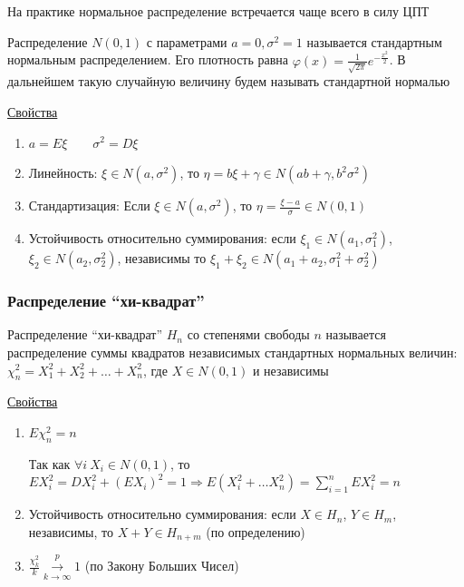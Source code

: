 \documentclass[12pt]{article}
\begin{document}
На практике нормальное распределение встречается чаще всего в силу ЦПТ

\Def Распределение $N(0, 1)$ с параметрами $a = 0, \sigma^2 = 1$ называется стандартным нормальным распределением. 
Его плотность равна $\varphi(x) = \frac{1}{\sqrt{2\pi}} e^{-\frac{x^2}{2}}$. 
В дальнейшем такую случайную величину будем называть стандартной нормалью

\underline{Свойства}

\begin{enumerate}
    \item $a = E\xi \qquad \sigma^2 = D\xi$

    \item Линейность: $\xi \in N(a, \sigma^2)$, то $\eta = b \xi + \gamma \in N(ab + \gamma, b^2 \sigma^2)$

    \item Стандартизация: Если $\xi \in N(a, \sigma^2)$, то $\eta = \frac{\xi - a}{\sigma} \in N(0, 1)$

    \item Устойчивость относительно суммирования: если $\xi_1 \in N(a_1, \sigma^2_1)$, $\xi_2 \in N(a_2, \sigma^2_2)$, независимы
    то $\xi_1 + \xi_2 \in N(a_1 + a_2, \sigma^2_1 + \sigma^2_2)$
\end{enumerate}

\subsubsection{Распределение \enquote{хи-квадрат}}

\Def Распределение \enquote{хи-квадрат} $H_n$ со степенями свободы $n$ называется распределение
суммы квадратов независимых стандартных нормальных величин: $\chi^2_n = X_1^2 + X_2^2 + \dots + X_n^2$, 
где $X \in N(0, 1)$ и независимы

\underline{Свойства}

\begin{enumerate}
    \item $E\chi^2_n = n$

    \begin{MyProof}
        Так как $\forall i \ X_i \in N(0, 1)$, то $E X_i^2 = D X_i^2 + (EX_i)^2 = 1 \Longrightarrow E(X_i^2 + \dots X_n^2) = \sum_{i = 1}^n E X_i^2 = n$
    \end{MyProof}

    \item Устойчивость относительно суммирования: если $X \in H_n$, $Y \in H_m$, независимы, то $X + Y \in H_{n + m}$ (по определению) 


    \item $\frac{\chi_k^2}{k} \overset{p}{\underset{k \to \infty}{\longrightarrow}} 1$ (по Закону Больших Чисел)
\end{enumerate}
\end{document}
